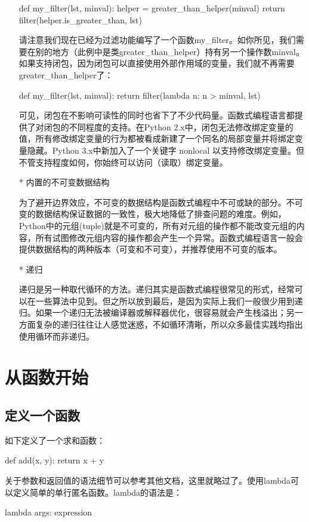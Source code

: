 \documentclass[12pt,a4paper]{report}
\begin{document}
\begin{enumerate}
\begin{python}[moreemph={[4]42},caption={},label=ex1]
def my_filter(lst, minval):
    helper = greater_than_helper(minval)
    return filter(helper.is_greater_than, lst)
    \end{python}
    请注意我们现在已经为过滤功能编写了一个函数my\_filter。如你所见，我们需要在别的地方（此例中是类greater\_than\_helper）持有另一个操作数minval。如果支持闭包，因为闭包可以直接使用外部作用域的变量，我们就不再需要greater\_than\_helper了： 
    \begin{python}[moreemph={[4]42},caption={},label=ex1]
def my_filter(lst, minval):
    return filter(lambda n: n > minval, lst)
    \end{python}
    可见，闭包在不影响可读性的同时也省下了不少代码量。函数式编程语言都提供了对闭包的不同程度的支持。在Python 2.x中，闭包无法修改绑定变量的值，所有修改绑定变量的行为都被看成新建了一个同名的局部变量并将绑定变量隐藏。Python 3.x中新加入了一个关键字 nonlocal 以支持修改绑定变量。但不管支持程度如何，你始终可以访问（读取）绑定变量。 

\item[*]内置的不可变数据结构
    
    为了避开边界效应，不可变的数据结构是函数式编程中不可或缺的部分。不可变的数据结构保证数据的一致性，极大地降低了排查问题的难度。例如，Python中的元组(tuple)就是不可变的，所有对元组的操作都不能改变元组的内容，所有试图修改元组内容的操作都会产生一个异常。函数式编程语言一般会提供数据结构的两种版本（可变和不可变），并推荐使用不可变的版本。

\item[*]递归

    递归是另一种取代循环的方法。递归其实是函数式编程很常见的形式，经常可以在一些算法中见到。但之所以放到最后，是因为实际上我们一般很少用到递归。如果一个递归无法被编译器或解释器优化，很容易就会产生栈溢出；另一方面复杂的递归往往让人感觉迷惑，不如循环清晰，所以众多最佳实践均指出使用循环而非递归。 
\end{enumerate} 

\chapter{从函数开始}
\section{定义一个函数} 
如下定义了一个求和函数：
\begin{python}[moreemph={[4]42},caption={},label=ex1]
def add(x, y):
    return x + y
\end{python}

关于参数和返回值的语法细节可以参考其他文档，这里就略过了。使用lambda可以定义简单的单行匿名函数。lambda的语法是： 
\begin{python}[moreemph={[4]42},caption={},label=ex1]
lambda args: expression
\end{python}
\end{document}
